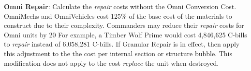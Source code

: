 \item {\bfseries Omni Repair}: Calculate the \emph{repair} costs without the Omni Conversion Cost.
OmniMechs and OmniVehicles cost 125\% of the base cost of the materials to construct due to their complexity.
Commanders may reduce their \emph{repair} costs for Omni units by 20%
For example, a Timber Wolf Prime would cost 4,846,625 C-bills to \emph{repair} instead of 6,058,281 C-bills.
If Granular Repair is in effect, then apply this adjustment to the the cost per internal section or structure bubble.
This modification does not apply to the cost \emph{replace} the unit when destroyed.

